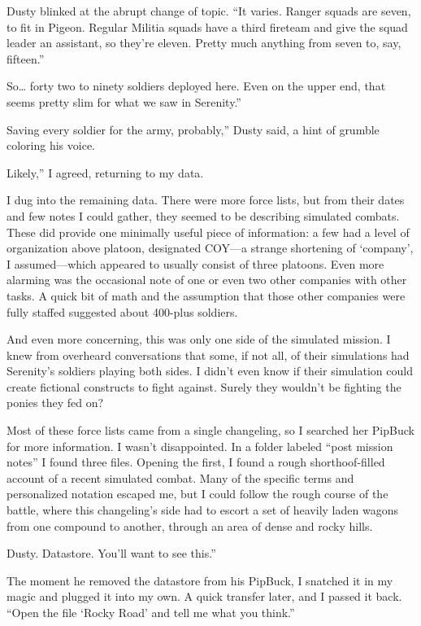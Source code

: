 Dusty blinked at the abrupt change of topic. “It varies. Ranger squads are seven, to fit in Pigeon. Regular Militia squads have a third fireteam and give the squad leader an assistant, so they’re eleven. Pretty much anything from seven to, say, fifteen.”

\leavevmode{}So… forty two to ninety soldiers deployed here. Even on the upper end, that seems pretty slim for what we saw in Serenity.”

\leavevmode{}Saving every soldier for the army, probably,” Dusty said, a hint of grumble coloring his voice.

\leavevmode{}Likely,” I agreed, returning to my data.

I dug into the remaining data. There were more force lists, but from their dates and few notes I could gather, they seemed to be describing simulated combats. These did provide one minimally useful piece of information: a few had a level of organization above platoon, designated COY—a strange shortening of ‘company’, I assumed—which appeared to usually consist of three platoons. Even more alarming was the occasional note of one or even two other companies with other tasks. A quick bit of math and the assumption that those other companies were fully staffed suggested about 400-plus soldiers.

And even more concerning, this was only one side of the simulated mission. I knew from overheard conversations that some, if not all, of their simulations had Serenity’s soldiers playing both sides. I didn’t even know if their simulation could create fictional constructs to fight against. Surely they wouldn’t be fighting the ponies they fed on?

Most of these force lists came from a single changeling, so I searched her PipBuck for more information. I wasn’t disappointed. In a folder labeled “post mission notes” I found three files. Opening the first, I found a rough shorthoof-filled account of a recent simulated combat. Many of the specific terms and personalized notation escaped me, but I could follow the rough course of the battle, where this changeling’s side had to escort a set of heavily laden wagons from one compound to another, through an area of dense and rocky hills.

\leavevmode{}Dusty. Datastore. You’ll want to see this.”

The moment he removed the datastore from his PipBuck, I snatched it in my magic and plugged it into my own. A quick transfer later, and I passed it back. “Open the file ‘Rocky Road’ and tell me what you think.”

